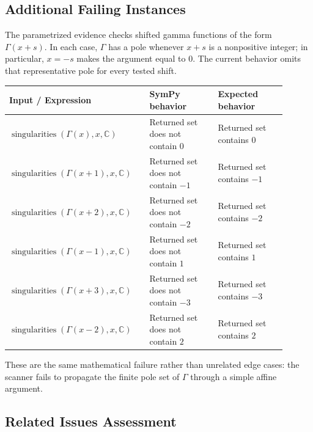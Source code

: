 \documentclass[11pt]{article}
\begin{document}
\subsection{Additional Failing Instances}

The parametrized evidence checks shifted gamma functions of the form \(\Gamma(x+s)\). In each case, \(\Gamma\) has a pole whenever \(x+s\) is a nonpositive integer; in particular, \(x=-s\) makes the argument equal to \(0\). The current behavior omits that representative pole for every tested shift.

\begin{center}
\small
\renewcommand{\arraystretch}{1.3}
\begin{tabular}{@{}>{\raggedright\arraybackslash}p{0.44\linewidth}>{\raggedright\arraybackslash}p{0.23\linewidth}>{\raggedright\arraybackslash}p{0.23\linewidth}@{}}
\toprule
\textbf{Input / Expression} & \textbf{SymPy behavior} & \textbf{Expected behavior} \\
\midrule
\(\operatorname{singularities}(\Gamma(x), x, \mathbb{C})\) & Returned set does not contain \(0\) & Returned set contains \(0\) \\
\(\operatorname{singularities}(\Gamma(x+1), x, \mathbb{C})\) & Returned set does not contain \(-1\) & Returned set contains \(-1\) \\
\(\operatorname{singularities}(\Gamma(x+2), x, \mathbb{C})\) & Returned set does not contain \(-2\) & Returned set contains \(-2\) \\
\(\operatorname{singularities}(\Gamma(x-1), x, \mathbb{C})\) & Returned set does not contain \(1\) & Returned set contains \(1\) \\
\(\operatorname{singularities}(\Gamma(x+3), x, \mathbb{C})\) & Returned set does not contain \(-3\) & Returned set contains \(-3\) \\
\(\operatorname{singularities}(\Gamma(x-2), x, \mathbb{C})\) & Returned set does not contain \(2\) & Returned set contains \(2\) \\
\bottomrule
\end{tabular}
\end{center}

These are the same mathematical failure rather than unrelated edge cases: the scanner fails to propagate the finite pole set of \(\Gamma\) through a simple affine argument.

\subsection{Related Issues Assessment}
\end{document}

